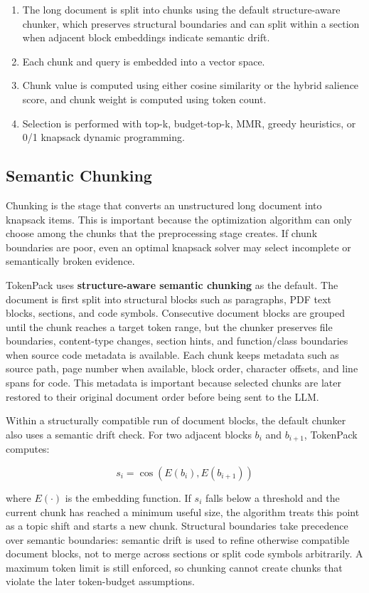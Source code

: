 \documentclass[conference]{IEEEtran}
\begin{document}
\begin{enumerate}
  \item The long document is split into chunks using the default structure-aware chunker, which preserves structural boundaries and can split within a section when adjacent block embeddings indicate semantic drift.
  \item Each chunk and query is embedded into a vector space.
  \item Chunk value is computed using either cosine similarity or the hybrid salience score, and chunk weight is computed using token count.
  \item Selection is performed with top-k, budget-top-k, MMR, greedy heuristics, or 0/1 knapsack dynamic programming.
\end{enumerate}

\subsection{Semantic Chunking}
Chunking is the stage that converts an unstructured long document into knapsack items. This is important because the optimization algorithm can only choose among the chunks that the preprocessing stage creates. If chunk boundaries are poor, even an optimal knapsack solver may select incomplete or semantically broken evidence.

TokenPack uses \textbf{structure-aware semantic chunking} as the default. The document is first split into structural blocks such as paragraphs, PDF text blocks, sections, and code symbols. Consecutive document blocks are grouped until the chunk reaches a target token range, but the chunker preserves file boundaries, content-type changes, section hints, and function/class boundaries when source code metadata is available. Each chunk keeps metadata such as source path, page number when available, block order, character offsets, and line spans for code. This metadata is important because selected chunks are later restored to their original document order before being sent to the LLM.

Within a structurally compatible run of document blocks, the default chunker also uses a semantic drift check. For two adjacent blocks $b_i$ and $b_{i+1}$, TokenPack computes:

\begin{equation}
s_i = \cos(E(b_i), E(b_{i+1}))
\end{equation}

where $E(\cdot)$ is the embedding function. If $s_i$ falls below a threshold and the current chunk has reached a minimum useful size, the algorithm treats this point as a topic shift and starts a new chunk. Structural boundaries take precedence over semantic boundaries: semantic drift is used to refine otherwise compatible document blocks, not to merge across sections or split code symbols arbitrarily. A maximum token limit is still enforced, so chunking cannot create chunks that violate the later token-budget assumptions.
\end{document}
